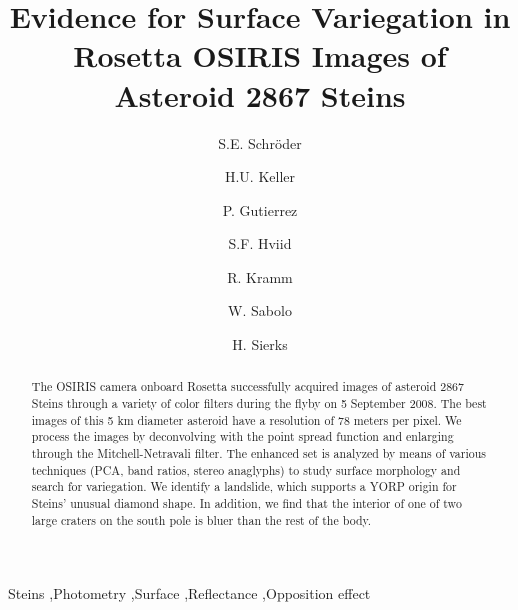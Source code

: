 \documentclass[preprint,3p,authoryear]{elsarticle}
\begin{document}
\begin{frontmatter}



\title{Evidence for Surface Variegation in Rosetta OSIRIS Images of Asteroid 2867 Steins}


\author[label1]{S.E. Schr\"oder}
\author[label1]{H.U. Keller}
\author[label2]{P. Gutierrez}
\author[label1]{S.F. Hviid}
\author[label1]{R. Kramm}
\author[label2]{W. Sabolo}
\author[label1]{H. Sierks}

\address[label1]{Max-Planck-Institut f\"ur Sonnensystemforschung, Katlenburg-Lindau, Germany}
\address[label2]{Instituto de Astrof\'isica de Andaluc\'ia-CSIC, Granada, Spain}

\begin{abstract}
The OSIRIS camera onboard Rosetta successfully acquired images of asteroid 2867 Steins through a variety of color filters during the flyby on 5 September 2008. The best images of this 5 km diameter asteroid have a resolution of 78 meters per pixel. We process the images by deconvolving with the point spread function and enlarging through the Mitchell-Netravali filter. The enhanced set is analyzed by means of various techniques (PCA, band ratios, stereo anaglyphs) to study surface morphology and search for variegation. We identify a landslide, which supports a YORP origin for Steins' unusual diamond shape. In addition, we find that the interior of one of two large craters on the south pole is bluer than the rest of the body.
\end{abstract}

\begin{keyword}
Steins \sep Photometry \sep Surface \sep Reflectance \sep Opposition effect


\end{keyword}

\end{frontmatter}
\end{document}
